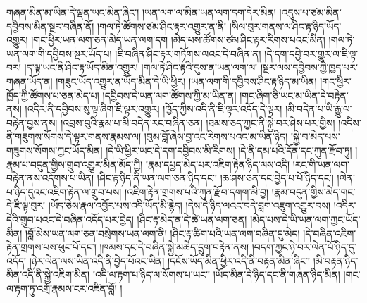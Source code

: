 གཞན་མིན་མ་ཡིན་དེ་ལྡན་ཡང་མིན་ཞིང་། །ཡན་ལག་ལ་མིན་ཡན་ལག་དག་དེར་མིན། །འདུས་པ་ཙམ་མིན་དབྱིབས་མིན་སྔར་བཞིན་ནོ། །གལ་ཏེ་ཚོགས་ཙམ་ཤིང་རྟར་འགྱུར་ན་ནི། །སིལ་བུར་གནས་ལ་ཤིང་རྟ་ཉིད་ཡོད་འགྱུར། །གང་ཕྱིར་ཡན་ལག་ཅན་མེད་ཡན་ལག་དག །མེད་པས་ཚོགས་ཙམ་ཤིང་རྟར་རིགས་པའང་མིན། །གལ་ཏེ་ཡན་ལག་གི་དབྱིབས་སྔར་ཡོད་པ། །ཇི་བཞིན་ཤིང་རྟར་གཏོགས་ལའང་དེ་བཞིན་ན། །དེ་དག་དབྱེ་བར་གྱུར་ལ་ཇི་ལྟ་བར། །ད་ལྟ་ཡང་ནི་ཤིང་རྟ་ཡོད་མིན་འགྱུར། །གལ་ཏེ་ཤིང་རྟའི་དུས་ན་ཡན་ལག་ལ། །སྔར་ལས་དབྱིབས་ཀྱི་ཁྱད་པར་གཞན་ཡོད་ན། །གཟུང་ཡོད་འགྱུར་ན་ཡོད་མིན་དེ་ཡི་ཕྱིར། །ཡན་ལག་གི་དབྱིབས་ཤིང་རྟ་ཉིད་མ་ཡིན། །གང་ཕྱིར་ཁྱོད་ཀྱི་ཚོགས་པ་ཅན་མེད་པ། །དབྱིབས་དེ་ཡན་ལག་ཚོགས་ཀྱི་མ་ཡིན་ན། །གང་ཞིག་ཅི་ཡང་མ་ཡིན་དེ་བརྟེན་ནས། །འདིར་ནི་དབྱིབས་སུ་ལྟ་ཞིག་ཇི་ལྟར་འགྱུར། །ཁྱོད་ཀྱིས་འདི་ནི་ཇི་ལྟར་འདོད་དེ་ལྟར། །མི་བདེན་པ་ཡི་རྒྱུ་ལ་བརྟེན་བྱས་ནས། །འབྲས་བུའི་རྣམ་པ་མི་བདེན་རང་བཞིན་ཅན། །ཐམས་ཅད་ཀྱང་ནི་སྐྱེ་བར་ཤེས་པར་གྱིས། །འདིས་ནི་གཟུགས་སོགས་དེ་ལྟར་གནས་རྣམས་ལ། །བུམ་བློ་ཞེས་བྱ་འང་རིགས་པའང་མ་ཡིན་ཉིད། །སྐྱེ་བ་མེད་པས་གཟུགས་སོགས་ཀྱང་ཡོད་མིན། །དེ་ཡི་ཕྱིར་ཡང་དེ་དག་དབྱིབས་མི་རིགས། །དེ་ནི་དམ་པའི་དོན་དང་ཀུན་རྫོབ་ཏུ། །རྣམ་པ་བདུན་གྱིས་གྲུབ་འགྱུར་མིན་མོད་ཀྱི། །རྣམ་དཔྱད་མེད་པར་འཇིག་རྟེན་ཉིད་ལས་འདི། །རང་གི་ཡན་ལག་བརྟེན་ནས་འདོགས་པ་ཡིན། །ཤིང་རྟ་ཉིད་ནི་ཡན་ལག་ཅན་ཉིད་དང་། །ཆ་ཤས་ཅན་དང་བྱེད་པ་པོ་ཉིད་དང་། །ལེན་པ་ཉིད་དུའང་འཇིག་རྟེན་ལ་གྲུབ་པས། །འཇིག་རྟེན་གྲགས་པའི་ཀུན་རྫོབ་དགག་མི་བྱ། །རྣམ་བདུན་གྱིས་མེད་གང་དེ་ཇི་ལྟ་བུར། །ཡོད་ཅེས་རྣལ་འབྱོར་པས་འདི་ཡོད་མི་རྙེད། །དེས་དེ་ཉིད་ལའང་བདེ་བླག་འཇུག་འགྱུར་བས། །འདིར་དེའི་གྲུབ་པའང་དེ་བཞིན་འདོད་པར་བྱེད། །ཤིང་རྟ་མེད་ན་དེ་ཚེ་ཡན་ལག་ཅན། །མེད་པས་དེ་ཡི་ཡན་ལག་ཀྱང་ཡོད་མིན། །བློ་མེས་ཡན་ལག་ཅན་བསྲེགས་ཡན་ལག་ནི། །ཤིང་རྟ་ཚིག་པའི་ཡན་ལག་བཞིན་དུ་མེད། །དེ་བཞིན་འཇིག་རྟེན་གྲགས་པས་ཕུང་པོ་དང་། །ཁམས་དང་དེ་བཞིན་སྐྱེ་མཆེད་དྲུག་བརྟེན་ནས། །བདག་ཀྱང་ཉེ་བར་ལེན་པོ་ཉིད་དུ་འདོད། །ཉེར་ལེན་ལས་ཡིན་འདི་ནི་བྱེད་པོའང་ཡིན། །དངོས་ཡོད་མིན་ཕྱིར་འདི་ནི་བརྟན་མིན་ཞིང་། །མི་བརྟན་ཉིད་མིན་འདི་ནི་སྐྱེ་འཇིག་མིན། །འདི་ལ་རྟག་པ་ཉིད་ལ་སོགས་པ་ཡང་། །ཡོད་མིན་དེ་ཉིད་དང་ནི་གཞན་ཉིད་མིན། །གང་ལ་རྟག་ཏུ་འགྲོ་རྣམས་ངར་འཛིན་བློ། །

